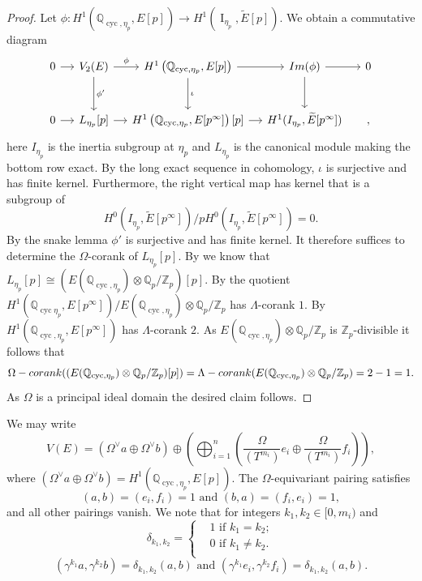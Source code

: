\documentclass[12pt]{amsart}
\newcommand{\Z}{\mathbb{Z}}
\newcommand{\Q}{\mathbb{Q}}
\newcommand{\op}[1]{\operatorname{#1}}
\numberwithin{equation}{section}
\begin{document}
\begin{proof}
Let $\phi\colon H^1(\Q_{\op{cyc},\eta_p},E[p])\longrightarrow H^1(\op{I}_{\eta_p}, \widetilde{E}[p])$. We obtain a commutative diagram
\begin{equation}
\begin{tikzcd}[column sep = small, row sep = large]
0\arrow{r} & V_2(E)\arrow{r}{\phi} \arrow{d}{\phi'} & H^1\left(\Q_{\op{cyc},\eta_p},E[p]\right) \arrow{r} \arrow{d}{\iota} & \textup{Im}(\phi) \arrow{d} \arrow{r}&0\\
0\arrow{r} & L_{\eta_p}[p] \arrow{r} & H^1\left(\Q_{\op{cyc},\eta_p},E[p^\infty]\right)[p] \arrow{r} &H^1(I_{\eta_p},\widetilde{E}[p^\infty])&,
\end{tikzcd}\end{equation}
here $I_{\eta_p}$ is the inertia subgroup at $\eta_p$ and $L_{\eta_p}$ is the canonical module making the bottom row exact. 
By the long exact sequence in cohomology, $\iota$ is surjective and has finite kernel. Furthermore, the right vertical map has kernel that is a subgroup of 
\[H^0(I_{\eta_p},\widetilde{E}[p^\infty])/pH^0(I_{\eta_p},\widetilde{E}[p^\infty])=0.\]
By the snake lemma $\phi'$ is surjective and has finite kernel. It therefore suffices to determine the $\Omega$-corank of $L_{\eta_p}[p]$.
By \cite[page 42]{greenberg-vatsal} we know that $L_{\eta_p}[p]\cong (E(\Q_{\op{cyc},\eta_p}) \otimes \Q_p/\Z_p)[p]$.
    By \cite{greenberg-vatsal} the quotient $H^1(\Q_{\op{cyc}\eta_p},E[p^\infty])/E(\Q_{\op{cyc},\eta_p})\otimes \Q_p/\Z_p$ has $\Lambda$-corank $1$. By \cite[Proposition 1]{Greenberpadic} $H^1(\Q_{\op{cyc},\eta_p},E[p^\infty])$ has $\Lambda$-corank $2$. As $E(\Q_{\op{cyc},\eta_p})\otimes \Q_p/\Z_p$ is $\Z_p$-divisible it follows that 
    \[\Omega\textup{-corank}((E(\Q_{\op{cyc},\eta_p})\otimes \Q_p/\Z_p)[p])=\Lambda\textup{-corank}(E(\Q_{\op{cyc},\eta_p})\otimes \Q_p/\Z_p)=2-1=1.\]
    As $\Omega$ is a principal ideal domain the desired claim follows.
\end{proof}
We may write
\[V(E)=\left(\Omega^\vee a \oplus \Omega^\vee b\right) \oplus \left(\bigoplus_{i=1}^n \left( \frac{\Omega}{(T^{m_i})} e_i \oplus \frac{\Omega}{(T^{m_i})} f_i\right)\right), \]
where $\left(\Omega^\vee a \oplus \Omega^\vee b\right)=H^1(\Q_{\op{cyc},\eta_p},E[p])$. 
The $\Omega$-equivariant pairing satisfies 
\[
    (a, b)=(e_i, f_i)=1\text{ and } (b,a)=(f_i, e_i)=1,
\]
and all other pairings vanish. We note that for integers $k_1, k_2\in [0, m_i)$ and \[\delta_{k_1, k_2}=\begin{cases} &1 \text{ if }k_1=k_2;\\
&0 \text{ if }k_1\neq k_2.\\\end{cases}\]
\[(\gamma^{k_1} a, \gamma^{k_2} b)=\delta_{k_1, k_2}(a,b)\text{ and }(\gamma^{k_1} e_i, \gamma^{k_2} f_i)=\delta_{k_1, k_2}(a,b).\]
\end{document}
